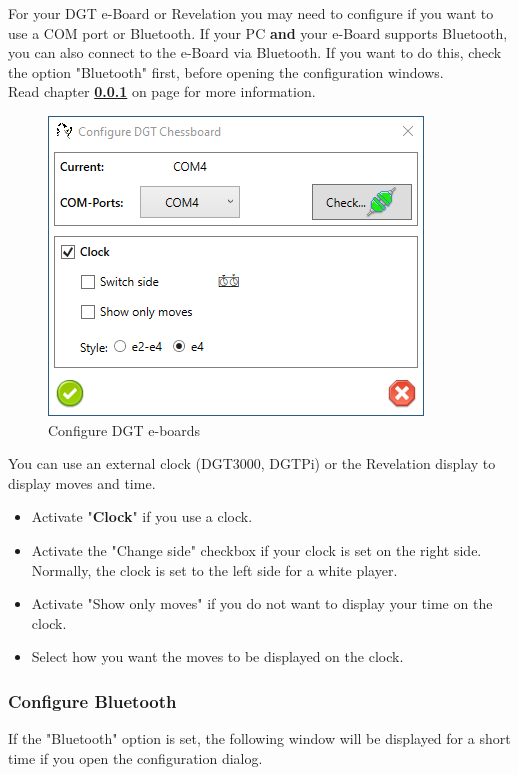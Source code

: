 \documentclass[11pt,a4paper]{article}
\begin{document}
For your DGT e-Board or Revelation you may need to configure if you want to use a COM port or Bluetooth. 
If your PC \textbf{and} your e-Board supports Bluetooth, you can also connect to the e-Board via Bluetooth. If you want to do this, check the option "Bluetooth" first, before opening the configuration windows.\\
Read chapter \textbf{\ref{BluetoothDGT}  } on page \pageref{BluetoothDGT} for more information.

\begin{figure}[H]
	\centering
	\includegraphics[scale=1.0]{DGTEBoard2.png}
	\caption{Configure DGT e-boards }
	\label{fig:DGTEBoard2}
\end{figure}

You can use an external clock (DGT3000, DGTPi) or the Revelation display to display moves and time.
\begin{itemize}
	\item Activate "\textbf{Clock}" if you use a clock.
	\item Activate the "Change side" checkbox if your clock is set on the right side. Normally, the clock is set to the left side for a white player. 
	\item Activate "Show only moves" if you do not want to display your time on the clock.
	\item Select how you want the moves to be displayed on the clock.
\end{itemize}


\subsubsection{Configure Bluetooth} \label{BluetoothDGT}

If the "Bluetooth" option is set, the following window will be displayed for a short time if you open the configuration dialog.
\end{document}

